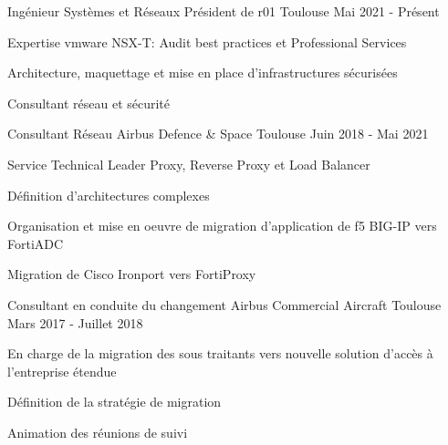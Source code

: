 

\begin{cventries}

  \cventry
    {Ingénieur Systèmes et Réseaux} %
    {Président de r01} %
    {Toulouse} %
    {Mai 2021 - Présent} %
    {
      \begin{cvitems} %
        \item {Expertise vmware NSX-T: Audit best practices et Professional Services}
        \item {Architecture, maquettage et mise en place d'infrastructures sécurisées}
        \item {Consultant réseau et sécurité}
      \end{cvitems}
    }

  \cventry
    {Consultant Réseau} %
    {Airbus Defence \& Space} %
    {Toulouse} %
    {Juin 2018 - Mai 2021} %
    {
      \begin{cvitems} %
        \item {Service Technical Leader Proxy, Reverse Proxy et Load Balancer}
        \item {Définition d'architectures complexes}
        \item {Organisation et mise en oeuvre de migration d'application de f5 BIG-IP vers FortiADC}
        \item {Migration de Cisco Ironport vers FortiProxy}
      \end{cvitems}
    }

  \cventry
    {Consultant en conduite du changement} %
    {Airbus Commercial Aircraft} %
    {Toulouse} %
    {Mars 2017 - Juillet 2018} %
    {
      \begin{cvdoubleitems} %
        \item {En charge de la migration des sous traitants vers nouvelle solution d'accès à l'entreprise étendue}
        \item {Définition de la stratégie de migration}
        \item {Animation des réunions de suivi}
      \end{cvdoubleitems}
    }


\end{cventries}
